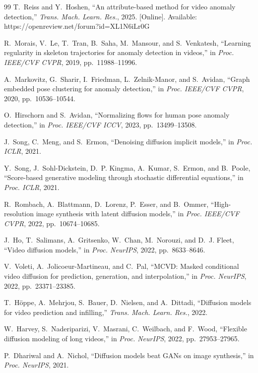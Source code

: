 \documentclass[11pt,a4paper]{article}
\begin{document}
\begin{thebibliography}{99}
T.~Reiss and Y.~Hoshen, ``An attribute-based method for video anomaly detection,'' \emph{Trans. Mach. Learn. Res.}, 2025. [Online]. Available: https://openreview.net/forum?id=XL1N6iLr0G

R.~Morais, V.~Le, T.~Tran, B.~Saha, M.~Mansour, and S.~Venkatesh, ``Learning regularity in skeleton trajectories for anomaly detection in videos,'' in \emph{Proc. IEEE/CVF CVPR}, 2019, pp.~11988--11996.

A.~Markovitz, G.~Sharir, I.~Friedman, L.~Zelnik-Manor, and S.~Avidan, ``Graph embedded pose clustering for anomaly detection,'' in \emph{Proc. IEEE/CVF CVPR}, 2020, pp.~10536--10544.

O.~Hirschorn and S.~Avidan, ``Normalizing flows for human pose anomaly detection,'' in \emph{Proc. IEEE/CVF ICCV}, 2023, pp.~13499--13508.

J.~Song, C.~Meng, and S.~Ermon, ``Denoising diffusion implicit models,'' in \emph{Proc. ICLR}, 2021.

Y.~Song, J.~Sohl-Dickstein, D.~P. Kingma, A.~Kumar, S.~Ermon, and B.~Poole, ``Score-based generative modeling through stochastic differential equations,'' in \emph{Proc. ICLR}, 2021.

R.~Rombach, A.~Blattmann, D.~Lorenz, P.~Esser, and B.~Ommer, ``High-resolution image synthesis with latent diffusion models,'' in \emph{Proc. IEEE/CVF CVPR}, 2022, pp.~10674--10685.

J.~Ho, T.~Salimans, A.~Gritsenko, W.~Chan, M.~Norouzi, and D.~J. Fleet, ``Video diffusion models,'' in \emph{Proc. NeurIPS}, 2022, pp.~8633--8646.

V.~Voleti, A.~Jolicoeur-Martineau, and C.~Pal, ``MCVD: Masked conditional video diffusion for prediction, generation, and interpolation,'' in \emph{Proc. NeurIPS}, 2022, pp.~23371--23385.

T.~H{\"o}ppe, A.~Mehrjou, S.~Bauer, D.~Nielsen, and A.~Dittadi, ``Diffusion models for video prediction and infilling,'' \emph{Trans. Mach. Learn. Res.}, 2022.

W.~Harvey, S.~Naderiparizi, V.~Masrani, C.~Weilbach, and F.~Wood, ``Flexible diffusion modeling of long videos,'' in \emph{Proc. NeurIPS}, 2022, pp.~27953--27965.

P.~Dhariwal and A.~Nichol, ``Diffusion models beat GANs on image synthesis,'' in \emph{Proc. NeurIPS}, 2021.


\end{thebibliography}
\end{document}
